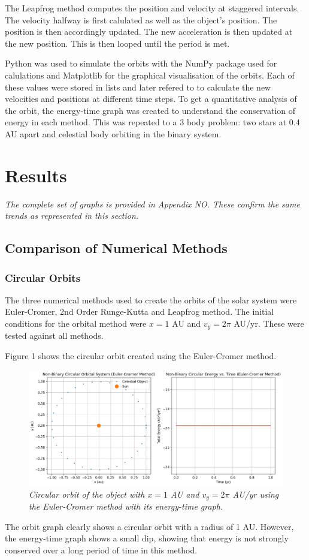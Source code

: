\documentclass[11 pt, a4paper]{article}
\begin{document}
The Leapfrog method computes the position and velocity at staggered intervals. The velocity halfway is first calulated as well as the object's position. The position is then accordingly updated. The new acceleration
is then updated at the new position. This is then looped until the period is met.

Python was used to simulate the orbits with the NumPy package used for calulations and Matplotlib for the graphical visualisation of the orbits. Each of these values were stored in lists and later refered to to calculate
the new velocities and positions at different time steps. To get a quantitative analysis of the orbit, the energy-time graph was created to understand the conservation of energy in each method. This was repeated
to a 3 body problem: two stars at 0.4 AU apart and celestial body orbiting in the binary system.

\section{Results}
\textit{The complete set of graphs is provided in Appendix NO. These confirm the same trends as represented in this section.}
\subsection{Comparison of Numerical Methods}
\subsubsection{Circular Orbits}
The three numerical methods used to create the orbits of the solar system were Euler-Cromer, 2nd Order Runge-Kutta and Leapfrog method.
The initial conditions for the orbital method were $x = 1$ AU and $v_y=2\pi$ AU/yr. These were tested against all methods.

Figure 1 shows the circular orbit created using the Euler-Cromer method.
\begin{figure}[H]
  \includegraphics[width=1\linewidth]{Euler cromer/eulercromercircular.png}
  \centering
  \caption{\textit{Circular orbit of the object with $x = 1$ AU and $v_y = 2\pi$ AU/yr using the Euler-Cromer method with its energy-time graph.}} 
\end{figure}
The orbit graph clearly shows a circular orbit with a radius of 1 AU. However, the energy-time graph shows a small dip, showing that energy is not strongly conserved over a long period of time in this method. 
\end{document}
